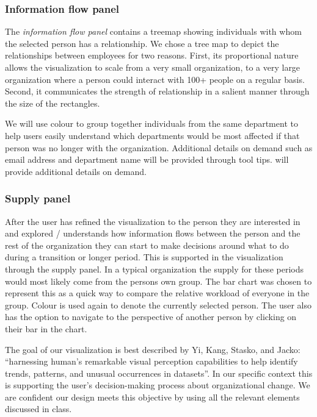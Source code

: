 \documentclass{soups}
\begin{document}
\subsubsection{Information flow panel}

The \emph{information flow panel} contains a treemap showing individuals with whom the selected person has a relationship. We chose a tree map to depict the relationships between employees for two reasons. First, its proportional nature allows the visualization to scale from a very small organization, to a very large organization where a person could interact with 100+ people on a regular basis. Second, it communicates the strength of relationship in a salient manner through the size of the rectangles.

We will use colour to group together individuals from the same department to help users easily understand which departments would be most affected if that person was no longer with the organization.  Additional details on demand\cite{anafigueiras} such as email address and department name will be provided through tool tips.  will provide additional details on demand. 

\subsubsection{Supply panel}

After the user has refined the visualization to the person they are interested in and explored / understands how information flows between the person and the rest of the organization they can start to make decisions around what to do during a transition or longer period.  This is supported in the visualization through the supply panel.  In a typical organization the supply for these periods would most likely come from the persons own group.  The bar chart was chosen to represent this as a quick way to compare the relative workload of everyone in the group.  Colour is used again to denote the currently selected person.  The user also has the option to navigate to the perspective of another person by clicking on their bar in the chart.

The goal of our visualization is best described by Yi, Kang, Stasko, and Jacko: “harnessing human’s remarkable visual perception capabilities to help identify trends, patterns, and unusual occurrences in datasets”\cite{yi2007toward}.  In our specific context this is supporting the user’s decision-making process about organizational change.  We are confident our design meets this objective by using all the relevant elements discussed in class.
\end{document}
